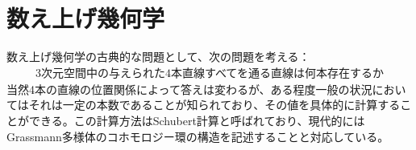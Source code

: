 \documentclass{ltjsreport}
\begin{document}
  \chapter{数え上げ幾何学}

  数え上げ幾何学の古典的な問題として、次の問題を考える：
  \begin{align*}
    \text{3次元空間中の与えられた4本直線すべてを通る直線は何本存在するか}
  \end{align*}
  当然4本の直線の位置関係によって答えは変わるが、ある程度一般の状況においてはそれは一定の本数であることが知られており、その値を具体的に計算することができる。この計算方法はSchubert計算と呼ばれており、現代的にはGrassmann多様体のコホモロジー環の構造を記述することと対応している。
  
\end{document}
